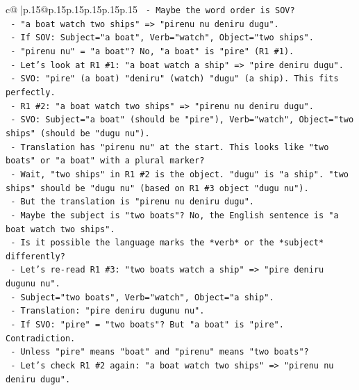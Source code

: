\documentclass{article}
\begin{document}
{\begin{supertabular}{c@{$\;$}|p{.15\linewidth}@{}p{.15\linewidth}p{.15\linewidth}p{.15\linewidth}p{.15\linewidth}p{.15\linewidth}}
{{{\texttt{        {-} Maybe the word order is SOV?} \\
\texttt{          {-} "a boat watch two ships" => "pirenu nu deniru dugu".} \\
\texttt{          {-} If SOV: Subject="a boat", Verb="watch", Object="two ships".} \\
\texttt{          {-} "pirenu nu" = "a boat"? No, "a boat" is "pire" (R1 \#1).} \\
\texttt{          {-} Let's look at R1 \#1: "a boat watch a ship" => "pire deniru dugu".} \\
\texttt{            {-} SVO: "pire" (a boat) "deniru" (watch) "dugu" (a ship). This fits perfectly.} \\
\texttt{          {-} R1 \#2: "a boat watch two ships" => "pirenu nu deniru dugu".} \\
\texttt{            {-} SVO: Subject="a boat" (should be "pire"), Verb="watch", Object="two ships" (should be "dugu nu").} \\
\texttt{            {-} Translation has "pirenu nu" at the start. This looks like "two boats" or "a boat" with a plural marker?} \\
\texttt{            {-} Wait, "two ships" in R1 \#2 is the object. "dugu" is "a ship". "two ships" should be "dugu nu" (based on R1 \#3 object "dugu nu").} \\
\texttt{            {-} But the translation is "pirenu nu deniru dugu".} \\
\texttt{            {-} Maybe the subject is "two boats"? No, the English sentence is "a boat watch two ships".} \\
\texttt{            {-} Is it possible the language marks the *verb* or the *subject* differently?} \\
\texttt{            {-} Let's re{-}read R1 \#3: "two boats watch a ship" => "pire deniru dugunu nu".} \\
\texttt{              {-} Subject="two boats", Verb="watch", Object="a ship".} \\
\texttt{              {-} Translation: "pire deniru dugunu nu".} \\
\texttt{              {-} If SVO: "pire" = "two boats"? But "a boat" is "pire". Contradiction.} \\
\texttt{              {-} Unless "pire" means "boat" and "pirenu" means "two boats"?} \\
\texttt{              {-} Let's check R1 \#2 again: "a boat watch two ships" => "pirenu nu deniru dugu".} \\
}}}
\end{supertabular}}
\end{document}
